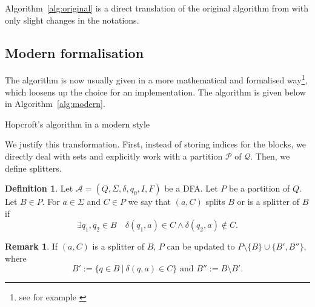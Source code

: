 \documentclass[12pt, a4 paper]{article}
\theoremstyle{definition}
\newtheorem{remark}{Remark}
\newtheorem{definition}{Definition}
\begin{document}
\bigskip

Algorithm~\ref{alg:original} is a direct translation of the original algorithm from \cite{Hop71} with only slight changes in the notations.

\subsection{Modern formalisation}

The algorithm is now usually given in a more mathematical and formalised way\footnote{see for example \cite{esparza2023automata}}, which loosens up the choice for an implementation.
The algorithm is given below in Algorithm~\ref{alg:modern}.

\bigskip

\begin{algorithm}[H]
    \SetAlgoLined
    \caption{Hopcroft's algorithm in a modern style}
    \label{alg:modern}
\end{algorithm}

\bigskip

We justify this transformation.
First, instead of storing indices for the blocks, we directly deal with sets and explicitly work with a partition $\mathcal{P}$ of $\mathcal{Q}$.
Then, we define splitters.

\begin{definition}
    Let $\mathcal{A} = (Q, \Sigma, \delta, q_0, I, F)$ be a DFA. Let $P$ be a partition of $Q$. Let $B \in P$. For $a \in \Sigma$ and $C \in P$ we say that
    $(a, C)$ splits $B$ or is a splitter of $B$ if $$\exists q_1, q_2 \in B \quad \delta(q_1, a) \in C \land \delta(q_2, a) \notin C.$$
\end{definition}
\begin{remark}
    If $(a, C)$ is a splitter of $B$, $P$ can be updated to $P \setminus \{B\} \cup \{B', B''\}$, where $$B' := \{q \in B \ | \ \delta(q, a) \in C\} \text{ and } B'' := B \setminus B'.$$
\end{remark}
\end{document}
